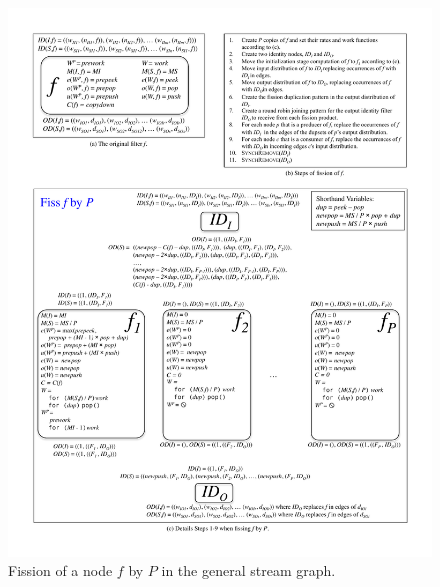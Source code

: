 \begin{figure}
\centering
\includegraphics[width=\textwidth]{figures/general-fission.pdf}
\caption[Fission of a node in the general stream graph.]{Fission of a
  node $f$ by $P$ in the general stream
  graph.\label{fig:general-fission}}
\end{figure}


